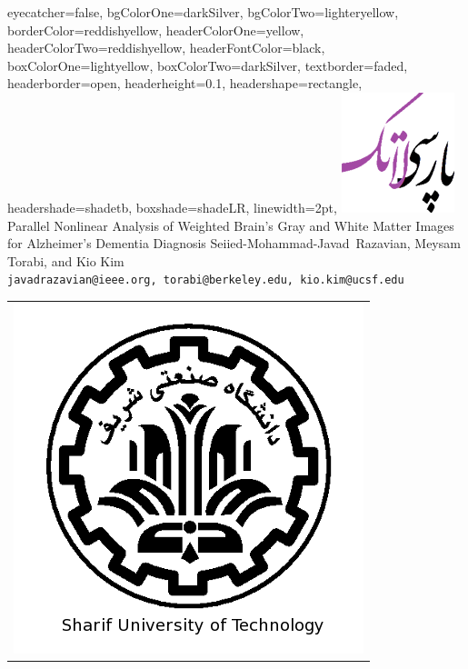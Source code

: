 \documentclass[portrait]{xebaposter}
\begin{document}
      \begin{poster}%
      {
      eyecatcher=false,
      bgColorOne=darkSilver,
      bgColorTwo=lighteryellow,
      borderColor=reddishyellow,
      headerColorOne=yellow,
      headerColorTwo=reddishyellow,
      headerFontColor=black,
      boxColorOne=lightyellow,
      boxColorTwo=darkSilver,
      textborder=faded,
      headerborder=open,
      headerheight=0.1\textheight,
      headershape=rectangle,
      headershade=shadetb,
      boxshade=shadeLR,
      linewidth=2pt,
      }
 {
      \includegraphics[width=0.08\linewidth]{logo}
 }
 {Parallel Nonlinear Analysis of Weighted Brain's Gray and White Matter Images for Alzheimer's Dementia Diagnosis}
 {\large Seiied-Mohammad-Javad~Razavian, Meysam Torabi, and Kio Kim \\%
 {\normalsize\texttt{javadrazavian@ieee.org, torabi@berkeley.edu, kio.kim@ucsf.edu}}}
 {
\begin{tabular}{r}
    \includegraphics[height=0.07 \textheight]{shariflogo}\\
\end{tabular}
 }


\end{poster}
\end{document}
